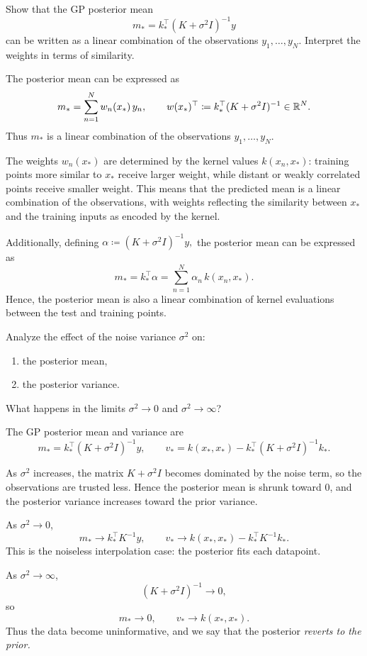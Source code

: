 \begin{exercise}
    Show that the GP posterior mean
    \[
    m_\ast = k_\ast^\top (K+\sigma^2 I)^{-1}y
    \]
    can be written as a linear combination of the observations \(y_1,\ldots,y_N\).
    Interpret the weights in terms of similarity.
\end{exercise}

\begin{solution}
The posterior mean can be expressed as 
\[
m_\ast = \sum_{n=1}^N w_n(x_\ast)\,y_n,
\qquad
w(x_\ast)^\top \coloneqq k_\ast^\top (K+\sigma^2 I)^{-1} \in{\mathbb R}^N.
\]
Thus \(m_\ast\) is a linear combination of the observations \(y_1,\dots,y_N\).

The weights \(w_n(x_\ast)\) are determined by the kernel values \(k(x_n,x_\ast)\): training points more similar to \(x_\ast\) receive larger weight, while distant or weakly correlated points receive smaller weight. This means that the predicted mean is a linear combination of the observations, with weights reflecting the similarity between \(x_\ast\) and the training inputs as encoded by the kernel.


Additionally, defining
\(
\alpha \coloneqq (K+\sigma^2 I)^{-1}y,
\)
the posterior mean can be  expressed as 
\[
m_\ast = k_\ast^\top \alpha
= \sum_{n=1}^N \alpha_n\,k(x_n,x_\ast).
\]
Hence, the posterior mean is also a linear combination of kernel evaluations between the test and training points.


\end{solution}


\begin{exercise}
    Analyze the effect of the noise variance \(\sigma^2\) on:
    \begin{enumerate}
        \item the posterior mean,
        \item the posterior variance.
    \end{enumerate}
    What happens in the limits \(\sigma^2 \to 0\) and \(\sigma^2 \to \infty\)?
\end{exercise}

\begin{solution}
The GP posterior mean and variance are
\[
m_\ast = k_\ast^\top (K+\sigma^2 I)^{-1}y,
\qquad
v_\ast = k(x_\ast,x_\ast) - k_\ast^\top (K+\sigma^2 I)^{-1}k_\ast.
\]

As \(\sigma^2\) increases, the matrix \(K+\sigma^2 I\) becomes dominated by the noise term, so the observations are trusted less. Hence the posterior mean is shrunk toward \(0\), and the posterior variance increases toward the prior variance.

As \(\sigma^2\to 0\),
\[
m_\ast \to k_\ast^\top K^{-1}y,
\qquad
v_\ast \to k(x_\ast,x_\ast)-k_\ast^\top K^{-1}k_\ast.
\]
This is the noiseless interpolation case: the posterior fits each datapoint.

As \(\sigma^2\to\infty\),
\[
(K+\sigma^2 I)^{-1}\to 0,
\]
so
\[
m_\ast \to 0,
\qquad
v_\ast \to k(x_\ast,x_\ast).
\]
Thus the data become uninformative, and we say that the posterior \emph{reverts to the prior.}
\end{solution}

